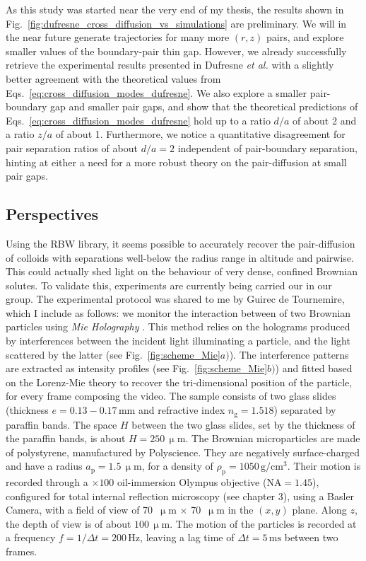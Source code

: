 As this study was started near the very end of my thesis, the results shown in Fig.~\ref{fig:dufresne_cross_diffusion_vs_simulations} are preliminary. We will in the near future generate trajectories for many more $(r, z)$ pairs, and explore smaller values of the boundary-pair thin gap. However, we already successfully retrieve the experimental results presented in Dufresne \emph{et al.} with a slightly better agreement with the theoretical values from Eqs.~\ref{eq:cross_diffusion_modes_dufresne}. We also explore a smaller pair-boundary gap and smaller pair gaps, and show that the theoretical predictions of Eqs.~\ref{eq:cross_diffusion_modes_dufresne} hold up to a ratio $d/a$ of about 2 and a ratio $z/a$ of about 1. Furthermore, we notice a quantitative disagreement for pair separation ratios of about $d/a = 2$ independent of pair-boundary separation, hinting at either a need for a more robust theory on the pair-diffusion at small pair gaps. 


\subsection{Perspectives}
Using the RBW library, it seems possible to accurately recover the pair-diffusion of colloids with separations well-below the radius range in altitude and pairwise. This could actually shed light on the behaviour of very dense, confined Brownian solutes. To validate this, experiments are currently being carried our in our group. The experimental protocol was shared to me by Guirec de Tournemire, which I include as follows: we monitor the interaction between of two Brownian particles using \textit{Mie Holography} \cite{lee2007characterizing,lavaud2021stochastic}. This method relies on the holograms produced by interferences between the incident light illuminating a particle, and the light scattered by the latter (see Fig.~\ref{fig:scheme_Mie}$a)$). The interference patterns are extracted as intensity profiles (see Fig.~\ref{fig:scheme_Mie}$b)$) and fitted based on the Lorenz-Mie theory to recover the tri-dimensional position of the particle, for every frame composing the video. The sample consists of two glass slides (thickness $e=0.13-0.17 \, \mathrm{mm}$ and refractive index $n_\mathrm{g}=1.518$) separated by paraffin bands. The space $H$ between the two glass slides, set by the thickness of the paraffin bands, is about $H = 250 \, \mathrm{\upmu m}$. The Brownian microparticles are made of polystyrene, manufactured by Polyscience. They are negatively surface-charged and have a radius $a_\mathrm{p} = 1.5 \, \mathrm{\upmu m}$, for a density of $\rho_\mathrm{p} = 1050 \, \mathrm{g/cm^3}$. Their motion is recorded through a $\times 100$ oil-immersion Olympus objective ($\mathrm{NA} = 1.45$), configured for total internal reflection microscopy (see chapter 3), using a Basler Camera, with a field of view of 70~$\upmu$m $\times$ 70~$\upmu$m in the $(x,y)$ plane. Along $z$, the depth of view is of about $100 \, \mathrm{\upmu m}$. The motion of the particles is recorded at a frequency $f=1/\Delta t=200 \, \mathrm{Hz}$, leaving a lag time of $\Delta t = 5 \, \mathrm{ms}$ between two frames.

